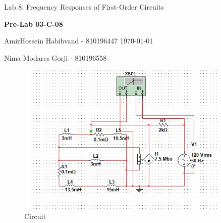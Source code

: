\documentclass[a4paper,twoside]{report}
\begin{document}
    {\large Lab 8: Frequency Responses of First-Order Circuits }
    \hfill
    {\large \textbf{Pre-Lab 03-C-08} \par}
	\vspace{0.1in}
    {\large AmirHossein Habibvand - 810196447}
    \hfill
    \today \par
    {\large Nima Modares Gorji - 810196558 \par}
	\vspace{0.5in}

	\begin{figure}[!h]
		\centering
		\includegraphics[width=0.9\textwidth]{circuit.jpg}
		\caption{Circuit}
		\label{fig:circuit}
	\end{figure}
	\vfill
	\pagebreak
\end{document}

